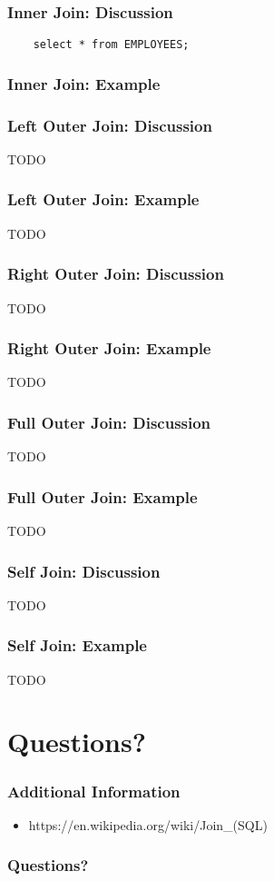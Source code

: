 \documentclass{beamer}
\begin{document}
\begin{frame}[containsverbatim]
  \frametitle{Inner Join: Discussion}
  \begin{lstlisting} 
    select * from EMPLOYEES;
  \end{lstlisting}
\end{frame}

\begin{frame}
  \frametitle{Inner Join: Example}
  
\end{frame}

\begin{frame}
  \frametitle{Left Outer Join: Discussion}
  TODO
\end{frame}

\begin{frame}
  \frametitle{Left Outer Join: Example}
  TODO
\end{frame}

\begin{frame}
  \frametitle{Right Outer Join: Discussion}
  TODO
\end{frame}

\begin{frame}
  \frametitle{Right Outer Join: Example}
  TODO
\end{frame}

\begin{frame}
  \frametitle{Full Outer Join: Discussion}
  TODO
\end{frame}

\begin{frame}
  \frametitle{Full Outer Join: Example}
  TODO
\end{frame}

\begin{frame}
  \frametitle{Self Join: Discussion}
  TODO
\end{frame}

\begin{frame}
  \frametitle{Self Join: Example}
  TODO
\end{frame}


\section{Questions?}

\begin{frame}
  \frametitle{Additional Information}
  \begin{itemize}
  \item https://en.wikipedia.org/wiki/Join\_(SQL)
  \end{itemize}
\end{frame}

\begin{frame}
 \frametitle{Questions?}

\end{frame}
\end{document}
